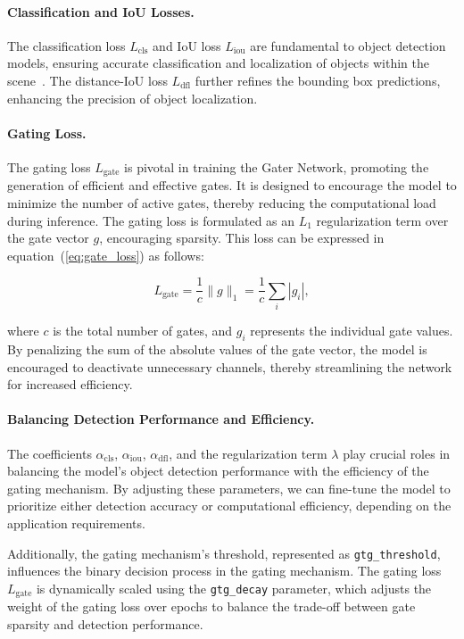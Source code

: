 \paragraph{Classification and IoU Losses.} The classification loss \(L_{\text{cls}}\) and IoU loss \(L_{\text{iou}}\) are fundamental to object detection models, ensuring accurate classification and localization of objects within the scene~\cite{li2023yolov6,li2022yolov6}. The distance-IoU loss \(L_{\text{dfl}}\) further refines the bounding box predictions, enhancing the precision of object localization.

\paragraph{Gating Loss.} The gating loss \(L_{\text{gate}}\) is pivotal in training the Gater Network, promoting the generation of efficient and effective gates. It is designed to encourage the model to minimize the number of active gates, thereby reducing the computational load during inference. The gating loss is formulated as an \(L_1\) regularization term over the gate vector \(g\), encouraging sparsity. This loss can be expressed in equation~(\ref{eq:gate_loss}) as follows:

\begin{equation}
L_{\text{gate}} = \frac{1}{c} \| g \|_1 = \frac{1}{c} \sum_{i} | g_i |,
\label{eq:gate_loss}
\end{equation}

\noindent{}where \(c\) is the total number of gates, and \(g_i\) represents the individual gate values. By penalizing the sum of the absolute values of the gate vector, the model is encouraged to deactivate unnecessary channels, thereby streamlining the network for increased efficiency.

\paragraph{Balancing Detection Performance and Efficiency.} The coefficients \(\alpha_{\text{cls}}\), \(\alpha_{\text{iou}}\), \(\alpha_{\text{dfl}}\), and the regularization term \(\lambda\) play crucial roles in balancing the model's object detection performance with the efficiency of the gating mechanism. By adjusting these parameters, we can fine-tune the model to prioritize either detection accuracy or computational efficiency, depending on the application requirements.

Additionally, the gating mechanism's threshold, represented as \texttt{gtg\_threshold}, influences the binary decision process in the gating mechanism. The gating loss \(L_{\text{gate}}\) is dynamically scaled using the \texttt{gtg\_decay} parameter, which adjusts the weight of the gating loss over epochs to balance the trade-off between gate sparsity and detection performance.

